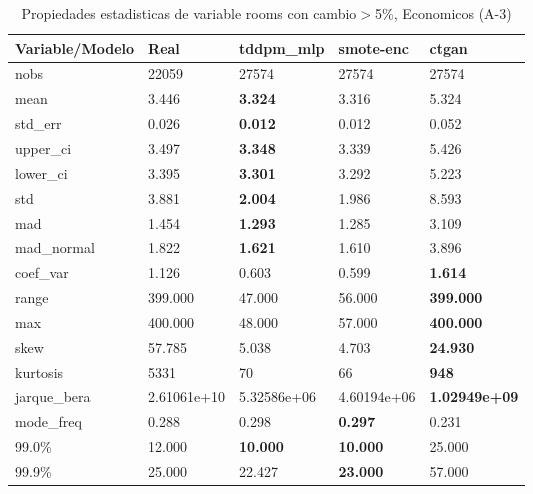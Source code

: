 \begin{table}[H]
\centering
\fontsize{8}{14}\selectfont
\caption{Propiedades estadisticas de variable rooms con cambio\ensuremath{>}5\%, Economicos (A-3)}
\label{table-stats-economicos-a-3-rooms-short}
\begin{tabular}{|l|m{10em}|m{10em}|m{10em}|m{10em}|}
\hline
 \rowcolor[gray]{0.8}
Variable/Modelo & Real & tddpm\_mlp & smote-enc & ctgan \\
\hline nobs & 22059 & 27574 & 27574 & 27574 \\
\hline mean & 3.446 & \bfseries 3.324 & 3.316 & \cellcolor[rgb]{0.9, 0.54, 0.52} 5.324 \\
\hline std\_err & 0.026 & \bfseries 0.012 & 0.012 & \cellcolor[rgb]{0.9, 0.54, 0.52} 0.052 \\
\hline upper\_ci & 3.497 & \bfseries 3.348 & 3.339 & \cellcolor[rgb]{0.9, 0.54, 0.52} 5.426 \\
\hline lower\_ci & 3.395 & \bfseries 3.301 & 3.292 & \cellcolor[rgb]{0.9, 0.54, 0.52} 5.223 \\
\hline std & 3.881 & \bfseries 2.004 & 1.986 & \cellcolor[rgb]{0.9, 0.54, 0.52} 8.593 \\
\hline mad & 1.454 & \bfseries 1.293 & 1.285 & \cellcolor[rgb]{0.9, 0.54, 0.52} 3.109 \\
\hline mad\_normal & 1.822 & \bfseries 1.621 & 1.610 & \cellcolor[rgb]{0.9, 0.54, 0.52} 3.896 \\
\hline coef\_var & 1.126 & 0.603 & \cellcolor[rgb]{0.9, 0.54, 0.52} 0.599 & \bfseries 1.614 \\
\hline range & 399.000 & \cellcolor[rgb]{0.9, 0.54, 0.52} 47.000 & 56.000 & \bfseries 399.000 \\
\hline max & 400.000 & \cellcolor[rgb]{0.9, 0.54, 0.52} 48.000 & 57.000 & \bfseries 400.000 \\
\hline skew & 57.785 & 5.038 & \cellcolor[rgb]{0.9, 0.54, 0.52} 4.703 & \bfseries 24.930 \\
\hline kurtosis & 5331 & 70 & \cellcolor[rgb]{0.9, 0.54, 0.52} 66 & \bfseries 948 \\
\hline jarque\_bera & 2.61061e+10 & 5.32586e+06 & \cellcolor[rgb]{0.9, 0.54, 0.52} 4.60194e+06 & \bfseries 1.02949e+09 \\
\hline mode\_freq & 0.288 & 0.298 & \bfseries 0.297 & \cellcolor[rgb]{0.9, 0.54, 0.52} 0.231 \\
\hline 99.0\% & 12.000 & \bfseries 10.000 & \bfseries 10.000 & \cellcolor[rgb]{0.9, 0.54, 0.52} 25.000 \\
\hline 99.9\% & 25.000 & 22.427 & \bfseries 23.000 & \cellcolor[rgb]{0.9, 0.54, 0.52} 57.000 \\
\hline
\end{tabular}
\end{table}
